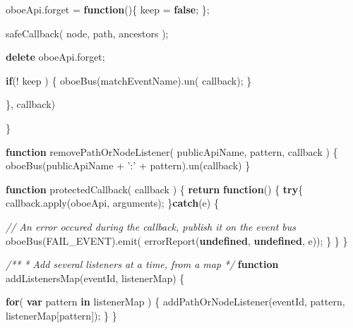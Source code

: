 \documentclass[12pt, ]{article}
\newenvironment{Shaded}{}{}
\newcommand{\KeywordTok}[1]{\textcolor[rgb]{0.00,0.44,0.13}{\textbf{{#1}}}}
\newcommand{\StringTok}[1]{\textcolor[rgb]{0.25,0.44,0.63}{{#1}}}
\newcommand{\CommentTok}[1]{\textcolor[rgb]{0.38,0.63,0.69}{\textit{{#1}}}}
\newcommand{\OtherTok}[1]{\textcolor[rgb]{0.00,0.44,0.13}{{#1}}}
\newcommand{\FunctionTok}[1]{\textcolor[rgb]{0.02,0.16,0.49}{{#1}}}
\newcommand{\NormalTok}[1]{{#1}}
\begin{document}
\begin{Shaded}
\begin{Highlighting}[]
         \OtherTok{oboeApi}\NormalTok{.}\FunctionTok{forget} \NormalTok{= }\KeywordTok{function}\NormalTok{()\{}
            \NormalTok{keep = }\KeywordTok{false}\NormalTok{;}
         \NormalTok{\};           }
         
         \FunctionTok{safeCallback}\NormalTok{( node, path, ancestors );         }
               
         \KeywordTok{delete} \OtherTok{oboeApi}\NormalTok{.}\FunctionTok{forget}\NormalTok{;}
         
         \KeywordTok{if}\NormalTok{(! keep ) \{          }
            \FunctionTok{oboeBus}\NormalTok{(matchEventName).}\FunctionTok{un}\NormalTok{( callback);}
         \NormalTok{\}}
                  
      
      \NormalTok{\}, callback)}

   \NormalTok{\}   }
   
   \KeywordTok{function} \FunctionTok{removePathOrNodeListener}\NormalTok{( publicApiName, pattern, callback ) \{}
      \FunctionTok{oboeBus}\NormalTok{(publicApiName + }\StringTok{':'} \NormalTok{+ pattern).}\FunctionTok{un}\NormalTok{(callback)}
   \NormalTok{\}}
         
   \KeywordTok{function} \FunctionTok{protectedCallback}\NormalTok{( callback ) \{}
      \KeywordTok{return} \KeywordTok{function}\NormalTok{() \{}
         \KeywordTok{try}\NormalTok{\{      }
            \OtherTok{callback}\NormalTok{.}\FunctionTok{apply}\NormalTok{(oboeApi, arguments);   }
         \NormalTok{\}}\KeywordTok{catch}\NormalTok{(e)  \{}
         
            \CommentTok{// An error occured during the callback, publish it on the event bus }
            \FunctionTok{oboeBus}\NormalTok{(FAIL_EVENT).}\FunctionTok{emit}\NormalTok{( }\FunctionTok{errorReport}\NormalTok{(}\KeywordTok{undefined}\NormalTok{, }\KeywordTok{undefined}\NormalTok{, e));}
         \NormalTok{\}      }
      \NormalTok{\}   }
   \NormalTok{\}}
      
   \CommentTok{/**}
\CommentTok{    * Add several listeners at a time, from a map}
\CommentTok{    */}
   \KeywordTok{function} \FunctionTok{addListenersMap}\NormalTok{(eventId, listenerMap) \{}
   
      \KeywordTok{for}\NormalTok{( }\KeywordTok{var} \NormalTok{pattern }\KeywordTok{in} \NormalTok{listenerMap ) \{}
         \FunctionTok{addPathOrNodeListener}\NormalTok{(eventId, pattern, listenerMap[pattern]);}
      \NormalTok{\}}
   \NormalTok{\}    }
      

\end{Highlighting}
\end{Shaded}
\end{document}
